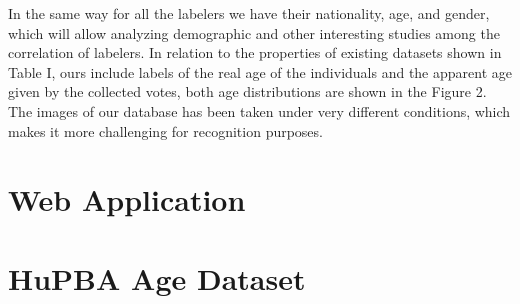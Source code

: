 In the same way for all the labelers we have their nationality, age, and gender, which will allow analyzing demographic and other interesting studies among the correlation of labelers. In relation to the properties of existing datasets shown in Table I, ours include labels of the real age of the individuals and the apparent age given by the collected votes, both age distributions are shown in the Figure 2. The images of our database has been taken under very different conditions, which makes it more challenging for recognition purposes.

\section{Web Application}

\section{HuPBA Age Dataset}